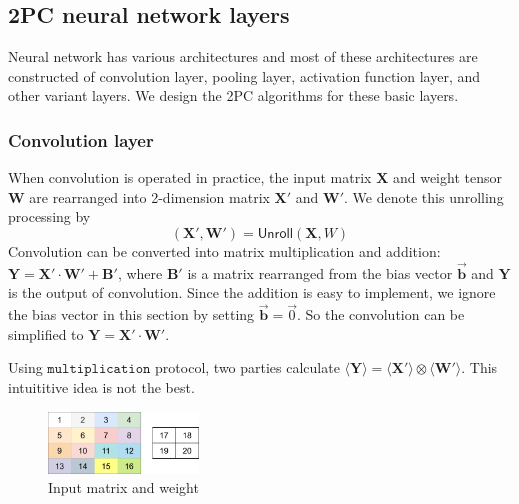 \documentclass[letterpaper]{article} %
\begin{document}
\subsection{2PC neural network layers}
    Neural network has various architectures and
    most of these architectures are constructed of convolution layer,
    pooling layer, activation function layer, and other variant layers.
    We design the 2PC algorithms for these basic layers.



    \subsubsection{Convolution layer}


    When convolution is operated in practice,
    the input matrix $\mathbf{X}$ and weight tensor $\mathbf{W}$
    are rearranged into 2-dimension matrix $\mathbf{X}'$ and $\mathbf{W}'$.
    We denote this unrolling processing by
    $$(\mathbf{X}',\mathbf{W}')=\mathsf{Unroll} (\mathbf{X},W)$$
    Convolution can be converted into matrix multiplication and addition:
    $\mathbf{Y}=\mathbf{X}'\cdot \mathbf{W}'+\mathbf{B}'$, where $\mathbf{B}'$ is a matrix rearranged from the bias vector $\overrightarrow{\mathbf{b}}$ and
    $\mathbf{Y}$ is the output of convolution.
    Since the addition is easy to implement, we ignore the bias vector in this section by setting $\overrightarrow{\mathbf{b}}=\overrightarrow{0}$.
    So the convolution can be simplified to $\mathbf{Y}=\mathbf{X}'\cdot \mathbf{W}'$.

    Using $\mathtt{multiplication}$ protocol,
    two parties calculate $\langle \mathbf{Y}\rangle=\langle \mathbf{X'}\rangle\otimes \langle \mathbf{W'}\rangle$.
    This intuititive idea is not the best.
    \begin{figure}[htbp]
        \centering
        \includegraphics[width=4cm]{new_unrolling.png}
        \caption{Input matrix and weight}
        \label{input matrix and weight}
    \end{figure}
\end{document}

